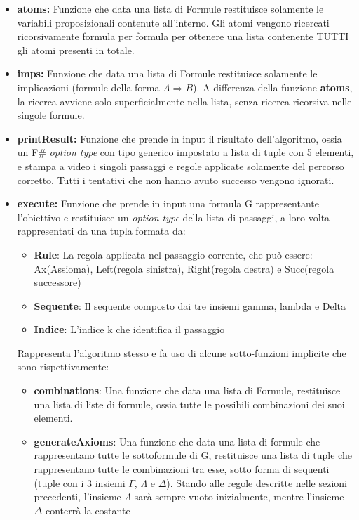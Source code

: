\documentclass[\main/tesi.tex]{subfiles}
\begin{document}
\begin{itemize}
    \item \textbf{atoms:} Funzione che data una lista di Formule restituisce solamente le variabili proposizionali contenute all'interno. Gli atomi vengono ricercati ricorsivamente formula per formula per ottenere una lista contenente TUTTI gli atomi presenti in totale.
    \item \textbf{imps:} Funzione che data una lista di Formule restituisce solamente le implicazioni (formule della forma $A \Rightarrow B$). A differenza della funzione \textbf{atoms}, la ricerca avviene solo superficialmente nella lista, senza ricerca ricorsiva nelle singole formule.
    \item \textbf{printResult:} Funzione che prende in input il risultato dell'algoritmo, ossia un F\# \cite{fsharp} \textit{option type} con tipo generico impostato a lista di tuple con 5 elementi, e stampa a video i singoli passaggi e regole applicate solamente del percorso corretto. Tutti i tentativi che non hanno avuto successo vengono ignorati.
    \item \textbf{execute:} Funzione che prende in input una formula G rappresentante l'obiettivo e restituisce un \textit{option type} della lista di passaggi, a loro volta rappresentati da una tupla formata da:
          \begin{itemize}
              \item \textbf{Rule}: La regola applicata nel passaggio corrente, che può essere: Ax(Assioma), Left(regola sinistra), Right(regola destra) e Succ(regola successore)
              \item \textbf{Sequente}: Il sequente composto dai tre insiemi gamma, lambda e Delta
              \item \textbf{Indice}: L'indice k che identifica il passaggio
          \end{itemize}
          Rappresenta l'algoritmo stesso e fa uso di alcune sotto-funzioni implicite che sono rispettivamente:
          \begin{itemize}
              \item \textbf{combinations}: Una funzione che data una lista di Formule, restituisce una lista di liste di formule, ossia tutte le possibili combinazioni dei suoi elementi.
              \item \textbf{generateAxioms}: Una funzione che data una lista di formule che rappresentano tutte le sottoformule di G, restituisce una lista di tuple che rappresentano tutte le combinazioni tra esse, sotto forma di sequenti (tuple con i 3 insiemi $\Gamma$, $\Lambda$ e $\Delta$). Stando alle regole descritte nelle sezioni precedenti, l'insieme $\Lambda$ sarà sempre vuoto inizialmente, mentre l'insieme $\Delta$ conterrà la costante $\bot$

\end{itemize}
\end{itemize}
\end{document}
